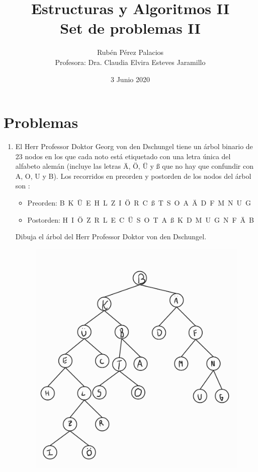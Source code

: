 \documentclass[letterpaper]{article}
\title{Estructuras y Algoritmos II\\Set de problemas II}
\author{Rubén Pérez Palacios\\Profesora: Dra. Claudia Elvira Esteves Jaramillo}
\date{3 Junio 2020}
\theoremstyle{definition}
\theoremstyle{lemathm}
\theoremstyle{lemademthm}
\begin{document}
	\maketitle

	\section*{Problemas}

	\begin{enumerate}
		\item El Herr Professor Doktor Georg von den Dschungel tiene un \'arbol binario de 23 nodos en los que cada noto est\'a etiquetado con una letra \'unica del alfabeto alem\'an (incluye las letras {\"A}, {\"O}, {\"U} y {\ss} que no hay que confundir con A, O, U y B). Los recorridos en preorden y postorden de los nodos del \'arbol son :

		\begin{itemize}
		\item[]{Preorden: B~K~\"U~E~H~L~Z~I~\"O~R~C~\ss~T~S~O~A~\"A~D~F~M~N~U~G}
		\item[]{Postorden: H~I~\"O~Z~R~L~E~C~\"U~S~O~T~A~\ss~K~D~M~U~G~N~F~\"A~B}
		\end{itemize}
		
		Dibuja el \'arbol del Herr Professor Doktor von den Dschungel.

		\begin{figure}[H]
			\centering
			\includegraphics[scale=.25]{images/arbol}
		\end{figure}


\end{enumerate}
\end{document}
